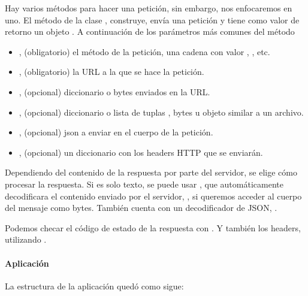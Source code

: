 Hay varios métodos para hacer una petición, sin embargo, nos enfocaremos en uno.
El método  de la clase , construye, envía una petición
y tiene  como valor de retorno un objeto .
A continuación de los parámetros más comunes del método 
\begin{itemize}
\item {} 
, (obligatorio) el método de la petición, una cadena con valor , , etc.

\item {} 
, (obligatorio) la URL a la que se hace la petición.

\item {} 
, (opcional) diccionario o bytes enviados en la URL.

\item {} 
, (opcional)  diccionario o lista de tuplas , bytes u objeto similar a un archivo.

\item {} 
, (opcional) json a enviar en el cuerpo de la petición.

\item {} 
, (opcional) un diccionario con los headers HTTP que se enviarán.

\end{itemize}

Dependiendo del contenido de la respuesta por parte del servidor, se elige cómo
procesar la respuesta. Si es solo texto, se puede usar ,
que automáticamente decodificara el contenido enviado por el servidor,
, si queremos acceder al cuerpo del mensaje como bytes.
También cuenta con un decodificador de JSON, .

Podemos checar el código de estado de la respuesta con
. Y también los headers, utilizando .


\paragraph{Aplicación}
\label{\detokenize{chapter_two/desc_cloudnao:codigo}}
La estructura de la aplicación quedó como sigue:

